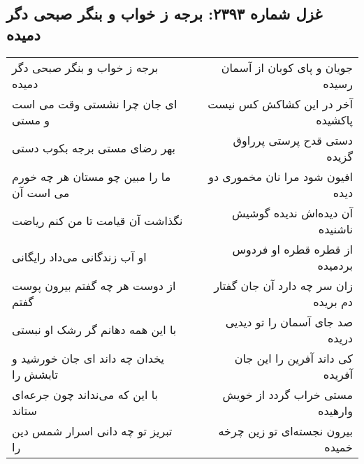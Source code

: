 \begin{center}
\section*{غزل شماره ۲۳۹۳: برجه ز خواب و بنگر صبحی دگر دمیده}
\label{sec:2393}
\begin{longtable}{l p{0.5cm} r}
برجه ز خواب و بنگر صبحی دگر دمیده
&&
جویان و پای کوبان از آسمان رسیده
\\
ای جان چرا نشستی وقت می است و مستی
&&
آخر در این کشاکش کس نیست پاکشیده
\\
بهر رضای مستی برجه بکوب دستی
&&
دستی قدح پرستی پرراوق گزیده
\\
ما را مبین چو مستان هر چه خورم می است آن
&&
افیون شود مرا نان مخموری دو دیده
\\
نگذاشت آن قیامت تا من کنم ریاضت
&&
آن دیده‌اش ندیده گوشیش ناشنیده
\\
او آب زندگانی می‌داد رایگانی
&&
از قطره قطره او فردوس بردمیده
\\
از دوست هر چه گفتم بیرون پوست گفتم
&&
زان سر چه دارد آن جان گفتار دم بریده
\\
با این همه دهانم گر رشک او نبستی
&&
صد جای آسمان را تو دیدیی دریده
\\
یخدان چه داند ای جان خورشید و تابشش را
&&
کی داند آفرین را این جان آفریده
\\
با این که می‌نداند چون جرعه‌ای ستاند
&&
مستی خراب گردد از خویش وارهیده
\\
تبریز تو چه دانی اسرار شمس دین را
&&
بیرون نجسته‌ای تو زین چرخه خمیده
\\
\end{longtable}
\end{center}
